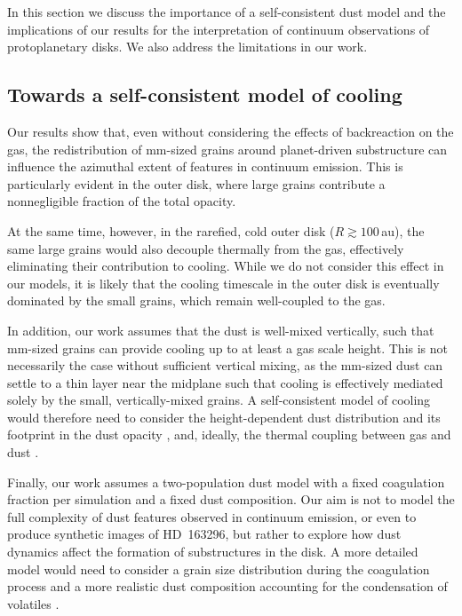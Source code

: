 \documentclass[fleqn,usenatbib,useAMS]{mnras}
\begin{document}
In this section we discuss the importance of a self-consistent dust model and the implications of our results for the interpretation of continuum observations of protoplanetary disks. We also address the limitations in our work.

\subsection{Towards a self-consistent model of cooling}

Our results show that, even without considering the effects of backreaction on the gas, the redistribution of mm-sized grains around planet-driven substructure can influence the azimuthal extent of features in continuum emission. This is particularly evident in the outer disk, where large grains contribute a nonnegligible fraction of the total opacity.

At the same time, however, in the rarefied, cold outer disk ($R\gtrsim100$\,au), the same large grains would also decouple thermally from the gas, effectively eliminating their contribution to cooling. While we do not consider this effect in our models, it is likely that the cooling timescale in the outer disk is eventually dominated by the small grains, which remain well-coupled to the gas.

In addition, our work assumes that the dust is well-mixed vertically, such that mm-sized grains can provide cooling up to at least a gas scale height. This is not necessarily the case without sufficient vertical mixing, as the mm-sized dust can settle to a thin layer near the midplane such that cooling is effectively mediated solely by the small, vertically-mixed grains. A self-consistent model of cooling would therefore need to consider the height-dependent dust distribution and its footprint in the dust opacity \citep[e.g.,][]{krapp-etal-2024,robinson-etal-2024}, and, ideally, the thermal coupling between gas and dust \citep[e.g.,][]{muley-etal-2023}.

Finally, our work assumes a two-population dust model with a fixed coagulation fraction per simulation and a fixed dust composition. Our aim is not to model the full complexity of dust features observed in continuum emission, or even to produce synthetic images of HD~163296, but rather to explore how dust dynamics affect the formation of substructures in the disk. A more detailed model would need to consider a grain size distribution during the coagulation process \citep[e.g.,][]{stammler-birnstiel-2022,robinson-etal-2024} and a more realistic dust composition accounting for the condensation of volatiles \citep[e.g.,][]{semenov-etal-2003}. 
\end{document}
